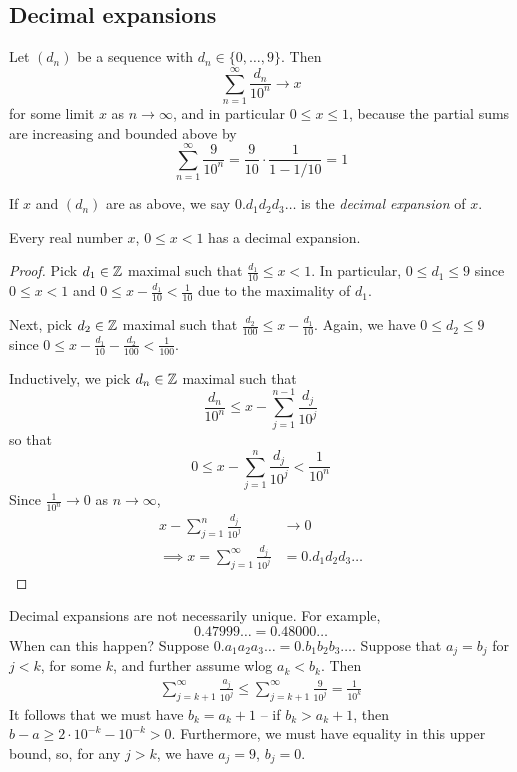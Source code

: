 \documentclass{../../template/note}
\begin{document}
    \subsection{Decimal expansions}

    Let \((d_n)\) be a sequence with \(d_n \in \{0, \dots, 9\}\). Then
    \[
        \sum_{n=1}^\infty \frac{d_n}{10^n} \to x
    \]
    for some limit \(x\) as \(n \to \infty\), and in particular \(0 \leq x \leq 1\), because the partial sums are increasing and bounded above by
    \[
        \sum_{n=1}^\infty \frac{9}{10^n} = \frac{9}{10} \cdot \frac{1}{1-1/10} = 1
    \]

    \begin{definition}
        If \(x\) and \((d_n)\) are as above, we say \(0.d_1d_2d_3\dots\) is the \emph{decimal expansion} of \(x\).
    \end{definition}

    \begin{proposition}
        Every real number \(x\), \(0 \leq x < 1\) has a decimal expansion.
    \end{proposition}
    
    \begin{proof}
        Pick \(d_1 \in \mathbb Z\) maximal such that \(\frac{d_1}{10} \leq x < 1\). In particular, \(0 \leq d_1 \leq 9\) since \(0 \leq x < 1\) and \(0 \leq x - \frac{d_1}{10} < \frac{1}{10}\) due to the maximality of \(d_1\).

        Next, pick \(d_2 \in \mathbb Z\) maximal such that \(\frac{d_2}{100} \leq x - \frac{d_1}{10}\). Again, we have \(0 \leq d_2 \leq 9\) since \(0 \leq x - \frac{d_1}{10} - \frac{d_2}{100} < \frac 1 {100}\).

        Inductively, we pick \(d_n \in \mathbb Z\) maximal such that
        \[
            \frac{d_n}{10^n} \leq x - \sum_{j=1}^{n-1} \frac{d_j}{10^j}
        \]
        so that
        \[
            0 \leq x - \sum_{j=1}^{n} \frac{d_j}{10^j} < \frac 1 {10^n}
        \]
        Since \(\frac{1}{10^n} \to 0\) as \(n \to \infty\),
        \begin{align*}
            x - \sum_{j=1}^n \frac{d_j}{10^j} &\to 0 \\
            \implies x = \sum_{j=1}^\infty \frac{d_j}{10^j} &= 0.d_1d_2d_3 \dots
        \end{align*}
    \end{proof}
    Decimal expansions are not necessarily unique. For example,
    \[
        0.47999\dots = 0.48000\dots
    \]
    When can this happen? Suppose \(0.a_1a_2a_3 \dots = 0.b_1b_2b_3 \dots\). Suppose that \(a_j = b_j\) for \(j < k\), for some \(k\), and further assume wlog \(a_k < b_k\). Then
    \begin{align*}
        \sum_{j=k+1}^\infty \frac{a_j}{10^j} \leq \sum_{j=k+1}^\infty \frac{9}{10^j} = \frac{1}{10^k}
    \end{align*}
    It follows that we must have \(b_k = a_k + 1\) -- if \(b_k > a_k+1\), then \(b-a \geq 2\cdot 10^{-k} - 10^{-k} > 0\). Furthermore, we must have equality in this upper bound, so, for any \(j > k\), we have \(a_j = 9\), \(b_j = 0\).
    
\end{document}
